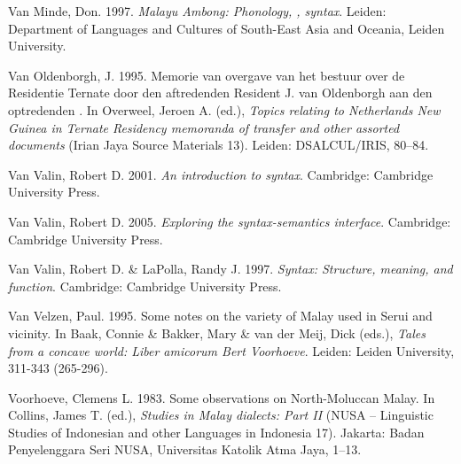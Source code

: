 \begin{styleCitaviBibliographyEntry}
Van Minde, Don. 1997. \textit{Malayu Ambong: Phonology, , syntax}. Leiden: Department of Languages and Cultures of South-East Asia and Oceania, Leiden University.
\end{styleCitaviBibliographyEntry}

\begin{styleCitaviBibliographyEntry}
Van Oldenborgh, J. 1995. Memorie van overgave van het bestuur over de Residentie Ternate door den aftredenden Resident J. van Oldenborgh aan den optredenden \citet{Resident1895}. In Overweel, Jeroen A. (ed.), \textit{Topics relating to Netherlands New Guinea in Ternate Residency memoranda of transfer and other assorted documents} (Irian Jaya Source Materials 13). Leiden: DSALCUL/IRIS, 80–84.
\end{styleCitaviBibliographyEntry}

\begin{styleCitaviBibliographyEntry}
Van Valin, Robert D. 2001. \textit{An introduction to syntax}. Cambridge: Cambridge University Press.
\end{styleCitaviBibliographyEntry}

\begin{styleCitaviBibliographyEntry}
Van Valin, Robert D. 2005. \textit{Exploring the syntax-semantics interface}. Cambridge: Cambridge University Press.
\end{styleCitaviBibliographyEntry}

\begin{styleCitaviBibliographyEntry}
Van Valin, Robert D. \& LaPolla, Randy J. 1997. \textit{Syntax: Structure, meaning, and function}. Cambridge: Cambridge University Press.
\end{styleCitaviBibliographyEntry}

\begin{styleCitaviBibliographyEntry}
Van Velzen, Paul. 1995. Some notes on the variety of Malay used in Serui and vicinity. In Baak, Connie \& Bakker, Mary \& van der Meij, Dick (eds.), \textit{Tales from a concave world: Liber amicorum Bert Voorhoeve}. Leiden: Leiden University, 311-343 (265-296).
\end{styleCitaviBibliographyEntry}

\begin{styleCitaviBibliographyEntry}
Voorhoeve, Clemens L. 1983. Some observations on North-Moluccan Malay. In Collins, James T. (ed.), \textit{Studies in Malay dialects: Part II} (NUSA – Linguistic Studies of Indonesian and other Languages in Indonesia 17). Jakarta: Badan Penyelenggara Seri NUSA, Universitas Katolik Atma Jaya, 1–13.
\end{styleCitaviBibliographyEntry}

